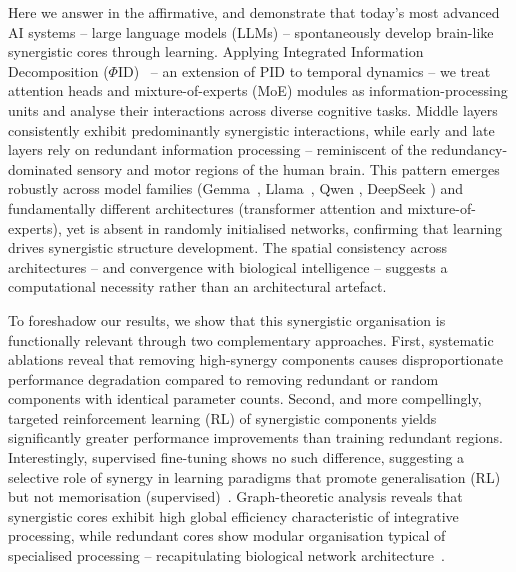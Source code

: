 \documentclass[11pt,a4paper]{ouparticle}
\begin{document}
Here we answer in the affirmative, and demonstrate that today's most advanced AI systems -- large language models (LLMs) -- spontaneously develop brain-like synergistic cores through learning. Applying Integrated Information Decomposition ($\Phi$ID)~\cite{phid2021} -- an extension of PID to temporal dynamics -- we treat attention heads and mixture-of-experts (MoE) modules as information-processing units and analyse their interactions across diverse cognitive tasks. Middle layers consistently exhibit predominantly synergistic interactions, while early and late layers rely on redundant information processing -- reminiscent of the redundancy-dominated sensory and motor regions of the human brain. This pattern emerges robustly across model families (Gemma~\cite{google2024gemma}, Llama~\cite{dubey2024llama}, Qwen \cite{yang2025qwen3}, DeepSeek \cite{liu2024deepseek}) and fundamentally different architectures (transformer attention and mixture-of-experts), yet is absent in randomly initialised networks, confirming that learning drives synergistic structure development. The spatial consistency across architectures -- and convergence with biological intelligence -- suggests a computational necessity rather than an architectural artefact.

To foreshadow our results, we show that this synergistic organisation is functionally relevant through two complementary approaches. First, systematic ablations reveal that removing high-synergy components causes disproportionate performance degradation compared to removing redundant or random components with identical parameter counts. Second, and more compellingly, targeted reinforcement learning (RL) of synergistic components yields significantly greater performance improvements than training redundant regions. Interestingly, supervised fine-tuning shows no such difference, suggesting a selective role of synergy in learning paradigms that promote generalisation (RL) but not memorisation (supervised)~\cite{chu2025sft}. Graph-theoretic analysis reveals that synergistic cores exhibit high global efficiency characteristic of integrative processing, while redundant cores show modular organisation typical of specialised processing -- recapitulating biological network architecture~\cite{luppi2022synergistic}.
\end{document}
